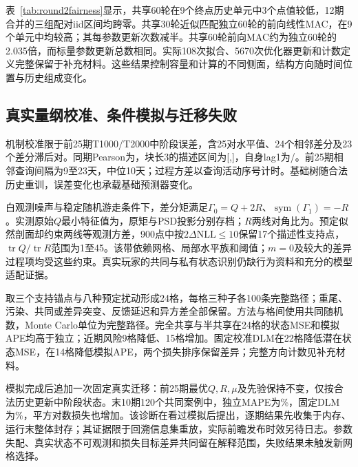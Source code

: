 表~\ref{tab:round2fairness}显示，共享60轮在9个终点历史单元中3个点值较低，12期合并的三组配对iid区间均跨零。共享30轮近似匹配独立60轮的前向线性MAC，在9个单元中均较高；其每参数更新次数减半。共享60轮前向MAC约为独立60轮的2.035倍，而标量参数更新总数相同。实际108次拟合、5670次优化器更新和计数定义完整保留于补充材料。这些结果控制容量和计算的不同侧面，结构方向随时间位置与历史组成变化。


\subsection{真实量纲校准、条件模拟与迁移失败}
机制校准限于前25期T1000/T2000中阶段误差，含25对水平值、24个相邻差分及23个差分滞后对。同期Pearson为\DContemp，块长3的描述区间为[\DCorrLow,\DCorrHigh]，自身lag1为\DLagOne/\DLagTwo。前25期相邻查询间隔为9至23天，中位10天；过程方差以查询活动序号计时。基础树随合法历史重训，误差变化也承载基础预测器变化。

白观测噪声与稳定随机游走条件下，差分矩满足\(\Gamma_0=Q+2R\)、\(\operatorname{sym}(\Gamma_1)=-R\)。实测原始\(Q\)最小特征值为\DQMin，原矩与PSD投影分别存档；\(R\)两线对角比为\DRatio。预定似然剖面却约束两线等观测方差，900点中按\(2\Delta\mathrm{NLL}\le10\)保留17个描述性支持点，\(\operatorname{tr}Q/\operatorname{tr}R\)范围为1至45。该带依赖网格、局部水平族和阈值；\(m=0\)及较大的差异过程项均受这些约束。真实玩家的共同与私有状态识别仍缺行为资料和充分的模型适配证据。

取三个支持锚点与八种预定扰动形成24格，每格三种子各100条完整路径；重尾、污染、共同或差异突变、反馈延迟和异方差全部保留。方法与格间使用共同随机数，Monte Carlo单位为完整路径。完全共享与半共享在24格的状态MSE和模拟APE均高于独立；近期风险9格降低、15格增加。固定校准DLM在22格降低潜在状态MSE，在14格降低模拟APE，两个损失排序保留差异；完整方向计数见补充材料。

模拟完成后追加一次固定真实迁移：前25期最优\(Q,R,\mu\)及先验保持不变，仅按合法历史更新中阶段状态。末10期120个共同案例中，独立MAPE为\DTransferI\%，固定DLM为\DTransfer\%，平方对数损失也增加。该诊断在看过模拟后提出，逐期结果先收集于内存、运行末整体封存；其证据限于回溯信息集重放，实际前瞻发布时效另待日志。参数失配、真实状态不可观测和损失目标差异共同留在解释范围，失败结果未触发新网格选择。
